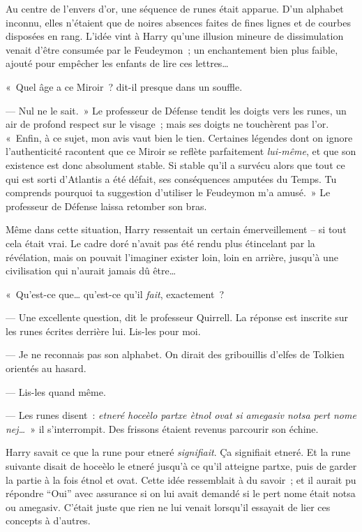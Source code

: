 Au centre de l'envers d'or, une séquence de runes était apparue. D'un alphabet inconnu, elles n'étaient que de noires absences faites de fines lignes et de courbes disposées en rang. L'idée vint à Harry qu'une illusion mineure de dissimulation venait d'être consumée par le Feudeymon~; un enchantement bien plus faible, ajouté pour empêcher les enfants de lire ces lettres…

«~Quel âge a ce Miroir~? dit-il presque dans un souffle.

--- Nul ne le sait.~» Le professeur de Défense tendit les doigts vers les runes, un air de profond respect sur le visage~; mais ses doigts ne touchèrent pas l'or. «~Enfin, à ce sujet, mon avis vaut bien le tien. Certaines légendes dont on ignore l'authenticité racontent que ce Miroir se reflète parfaitement \emph{lui-même}, et que son existence est donc absolument stable. Si stable qu'il a survécu alors que tout ce qui est sorti d'Atlantis a été défait, ses conséquences amputées du Temps. Tu comprends pourquoi ta suggestion d'utiliser le Feudeymon m'a amusé.~» Le professeur de Défense laissa retomber son bras.

Même dans cette situation, Harry ressentait un certain émerveillement -- si tout cela était vrai. Le cadre doré n'avait pas été rendu plus étincelant par la révélation, mais on pouvait l'imaginer exister loin, loin en arrière, jusqu'à une civilisation qui n'aurait jamais dû être…

«~Qu'est-ce que… qu'est-ce qu'il \emph{fait}, exactement~?

--- Une excellente question, dit le professeur Quirrell. La réponse est inscrite sur les runes écrites derrière lui. Lis-les pour moi.

--- Je ne reconnais pas son alphabet. On dirait des gribouillis d'elfes de Tolkien orientés au hasard.

--- Lis-les quand même. 

--- Les runes disent~: \emph{etneré hoceèlo partxe ètnol ovat si amegasiv notsa pert nome nej…}~» il s'interrompit. Des frissons étaient revenus parcourir son échine.

Harry savait ce que la rune pour etneré \emph{signifiait}. Ça signifiait etneré. Et la rune suivante disait de hoceèlo le etneré jusqu'à ce qu'il atteigne partxe, puis de garder la partie à la fois étnol et ovat. Cette idée ressemblait à du savoir~; et il aurait pu répondre “Oui” avec assurance si on lui avait demandé si le pert nome était notsa ou amegasiv. C'était juste que rien ne lui venait lorsqu'il essayait de lier ces concepts à d'autres.

